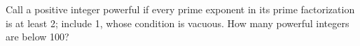 Call a positive integer powerful if every prime exponent in its prime factorization is at least 2; include 1, whose condition is vacuous. How many powerful integers are below 100?
